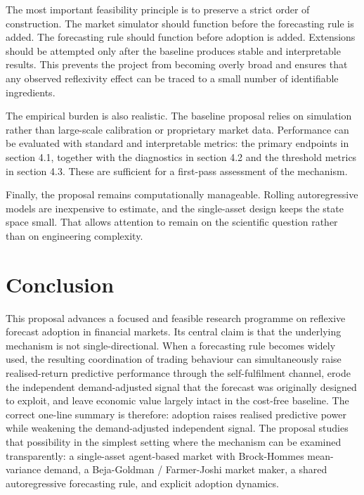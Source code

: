 \documentclass[11pt]{article}
\begin{document}
The most important feasibility principle is to preserve a strict order of construction. The market simulator should function before the forecasting rule is added. The forecasting rule should function before adoption is added. Extensions should be attempted only after the baseline produces stable and interpretable results. This prevents the project from becoming overly broad and ensures that any observed reflexivity effect can be traced to a small number of identifiable ingredients.

The empirical burden is also realistic. The baseline proposal relies on simulation rather than large-scale calibration or proprietary market data. Performance can be evaluated with standard and interpretable metrics: the primary endpoints in section 4.1, together with the diagnostics in section 4.2 and the threshold metrics in section 4.3. These are sufficient for a first-pass assessment of the mechanism.

Finally, the proposal remains computationally manageable. Rolling autoregressive models are inexpensive to estimate, and the single-asset design keeps the state space small. That allows attention to remain on the scientific question rather than on engineering complexity.


\section{Conclusion}

This proposal advances a focused and feasible research programme on reflexive forecast adoption in financial markets. Its central claim is that the underlying mechanism is not single-directional. When a forecasting rule becomes widely used, the resulting coordination of trading behaviour can simultaneously raise realised-return predictive performance through the self-fulfilment channel, erode the independent demand-adjusted signal that the forecast was originally designed to exploit, and leave economic value largely intact in the cost-free baseline. The correct one-line summary is therefore: adoption raises realised predictive power while weakening the demand-adjusted independent signal. The proposal studies that possibility in the simplest setting where the mechanism can be examined transparently: a single-asset agent-based market with Brock-Hommes mean-variance demand, a Beja-Goldman / Farmer-Joshi market maker, a shared autoregressive forecasting rule, and explicit adoption dynamics.
\end{document}
